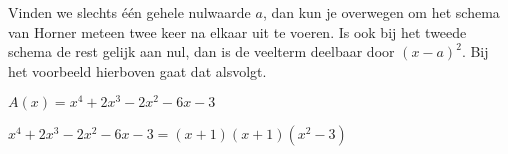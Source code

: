 \documentclass{ximera}
\begin{document}
Vinden we slechts één gehele nulwaarde $a$, dan kun je overwegen om  het schema van Horner meteen twee keer na elkaar uit te voeren. Is ook bij het tweede schema de rest gelijk aan nul, dan is de veelterm deelbaar door $(x-a)^2$. Bij het voorbeeld hierboven gaat dat alsvolgt.

\renewcommand{\kolbreed}{\widthof{$-6$}}

\(A(x) = x^4 + 2x^3 - 2x^2 - 6x - 3 \)


\( x^4 + 2x^3 - 2x^2 - 6x - 3 = (x+1)(x+1)(x^2-3) \)
\end{document}
